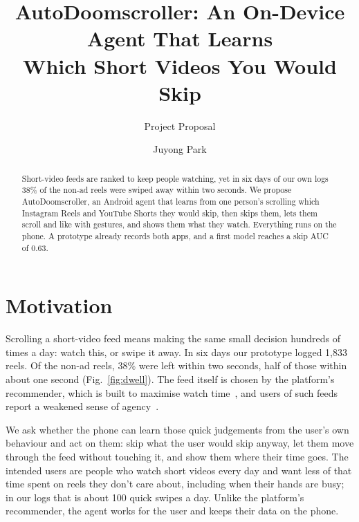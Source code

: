 \documentclass[sigconf,nonacm]{acmart}
\begin{document}
\title{AutoDoomscroller: An On-Device Agent That Learns\\Which Short Videos You Would Skip}
\subtitle{Project Proposal}

\author{Juyong Park}

\begin{abstract}
Short-video feeds are ranked to keep people watching, yet in six days of our own logs 38\% of
the non-ad reels were swiped away within two seconds. We propose AutoDoomscroller, an Android agent
that learns from one person's scrolling which Instagram Reels and YouTube Shorts they would
skip, then skips them, lets them scroll and like with gestures, and shows them what they
watch. Everything runs on the phone. A prototype already records both apps, and a first model
reaches a skip AUC of 0.63.
\end{abstract}

\maketitle

\section{Motivation}
Scrolling a short-video feed means making the same small decision hundreds of times a day:
watch this, or swipe it away. In six days our prototype logged 1{,}833 reels. Of the non-ad
reels, 38\% were left within two seconds, half of those within about one second
(Fig.~\ref{fig:dwell}). The feed itself is chosen by the platform's recommender, which is
built to maximise watch time~\cite{covington2016youtube,zhan2022duration}, and users of such
feeds report a weakened sense of agency~\cite{lukoff2021youtube}.

We ask whether the phone can learn those quick judgements from the user's own behaviour and
act on them: skip what the user would skip anyway, let them move through the feed without
touching it, and show them where their time goes. The intended users are people who watch
short videos every day and want less of that time spent on reels they don't care about,
including when their hands are busy; in our logs that is about 100 quick swipes a day. Unlike
the platform's recommender, the agent works for the user and keeps their data on the phone.
\end{document}
